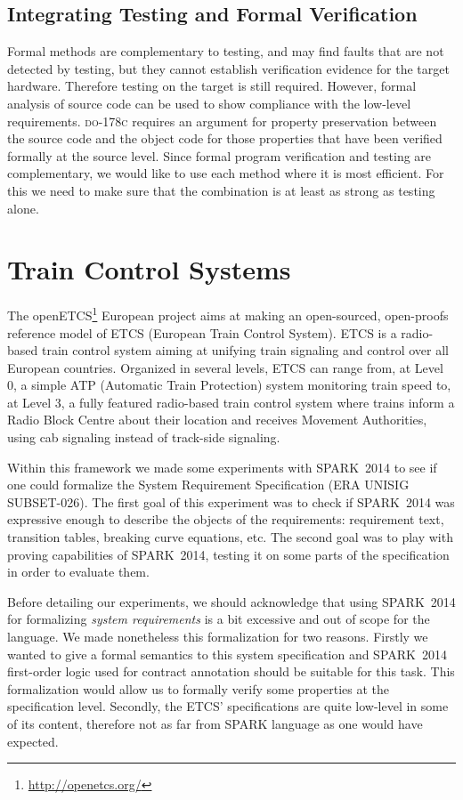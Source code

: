 \documentclass{article}
\newcommand{\DOC}{\textsc{do-178c}\xspace}
\newcommand{\newspark}{SPARK~2014\xspace}
\newcommand{\spark}{SPARK\xspace}
\begin{document}
\subsection{Integrating Testing and Formal Verification}

Formal methods are complementary to testing, and may find faults that
are not detected by testing, but they cannot establish verification
evidence for the target hardware. Therefore testing on the target is
still required. However, formal analysis of source code can be used to
show compliance with the low-level requirements. \DOC requires an
argument for property preservation between the source code and the
object code for those properties that have been verified formally at
the source level. Since formal program verification and testing are
complementary, we would like to use each method where it is most
efficient. For this we need to make sure that the combination is at
least as strong as testing alone.

\section{Train Control Systems}


The openETCS\footnote{\url{http://openetcs.org/}} European project
aims at making an open-sourced, open-proofs reference model of ETCS
(European Train Control System). ETCS is a radio-based train control
system aiming at unifying train signaling and control over all
European countries. Organized in several levels, ETCS can range from,
at Level 0, a simple ATP (Automatic Train Protection) system
monitoring train speed to, at Level 3, a fully featured radio-based
train control system where trains inform a Radio Block Centre about
their location and receives Movement Authorities, using cab signaling
instead of track-side signaling.

Within this framework we made some experiments with \newspark to see
if one could formalize the System Requirement Specification (ERA
UNISIG SUBSET-026). The first goal of this experiment was to check if
\newspark was expressive enough to describe the objects of the
requirements: requirement text, transition tables, breaking curve
equations, etc. The second goal was to play with proving capabilities
of \newspark, testing it on some parts of the specification in order
to evaluate them.

Before detailing our experiments, we should acknowledge that using
\newspark for formalizing \emph{system requirements} is a bit
excessive and out of scope for the language. We made nonetheless this
formalization for two reasons. Firstly we wanted to give a formal
semantics to this system specification and \newspark first-order logic
used for contract annotation should be suitable for this task. This
formalization would allow us to formally verify some properties at the
specification level.  Secondly, the ETCS' specifications are quite
low-level in some of its content, therefore not as far from \spark
language as one would have expected.
\end{document}
